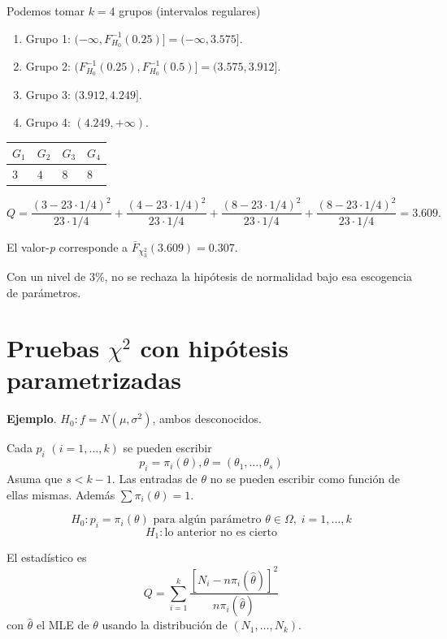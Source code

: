 \documentclass[
  12pt,
]{book}
\begin{document}
Podemos tomar \(k = 4\) grupos (intervalos regulares)

\begin{enumerate}
\def\labelenumi{\arabic{enumi}.}
\item
  Grupo 1: \((-\infty,F^{-1}_{H_0}(0.25)] = (-\infty,3.575]\).
\item
  Grupo 2: \((F^{-1}_{H_0}(0.25),F^{-1}_{H_0}(0.5)] = (3.575,3.912]\).
\item
  Grupo 3: \((3.912,4.249]\).
\item
  Grupo 4: \((4.249,+\infty)\).
\end{enumerate}

\begin{longtable}[]{@{}llll@{}}
\toprule
\(G_1\) & \(G_2\) & \(G_3\) & \(G_4\)\tabularnewline
\midrule
\endhead
\(3\) & \(4\) & \(8\) & \(8\)\tabularnewline
\bottomrule
\end{longtable}

\[Q = \dfrac{(3-23\cdot1/4)^2}{23\cdot 1/4} +  \dfrac{(4-23\cdot1/4)^2}{23\cdot 1/4}+\dfrac{(8-23\cdot1/4)^2}{23\cdot 1/4} + \dfrac{(8-23\cdot1/4)^2}{23\cdot 1/4}= 3.609.\]

El valor-\emph{p} corresponde a \(\bar F_{\chi^2_3}(3.609) = 0.307\).

Con un nivel de 3\%, no se rechaza la hipótesis de normalidad bajo esa escogencia de parámetros.

\hypertarget{pruebas-chi2-con-hipuxf3tesis-parametrizadas}{%
\section{\texorpdfstring{Pruebas \(\chi^2\) con hipótesis parametrizadas}{Pruebas \textbackslash chi\^{}2 con hipótesis parametrizadas}}\label{pruebas-chi2-con-hipuxf3tesis-parametrizadas}}

\textbf{Ejemplo}. \(H_0: f = N(\mu,\sigma^2)\), ambos desconocidos.

Cada \(p_i\) \((i=1,\dots,k)\) se pueden escribir
\[p_i = \pi_i(\theta), \theta = (\theta_1,\dots,\theta_s)\]
Asuma que \(s<k-1\). Las entradas de \(\theta\) no se pueden escribir como función de ellas mismas. Además \(\sum \pi_i(\theta) = 1\).

\[H_0: p_i = \pi_i(\theta)\text{ para algún parámetro }\theta\in \Omega,\;i=1,\dots,k\]
\[H_1: \text{lo anterior no es cierto}\]

El estadístico es
\[Q = \sum_{i=1}^k\dfrac{[N_i-n\pi_i(\hat\theta)]^2}{n\pi_i(\hat\theta)}\]
con \(\hat\theta\) el MLE de \(\theta\) usando la distribución de \((N_1,\dots,N_k)\).
\end{document}
